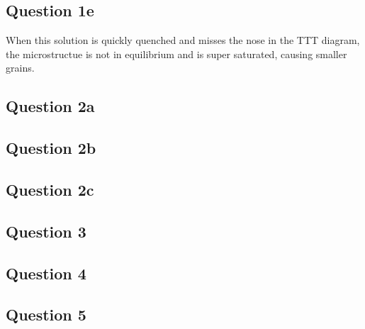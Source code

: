 \documentclass[12pt]{report}
\begin{document}
\subsection{Question 1e}

When this solution is quickly quenched and misses the nose in the TTT diagram, the microstructue is not in equilibrium and is super saturated, causing smaller grains.

\subsection{Question 2a}




\subsection{Question 2b}


\subsection{Question 2c}


\subsection{Question 3}


\subsection{Question 4}


\subsection{Question 5}
\end{document}
